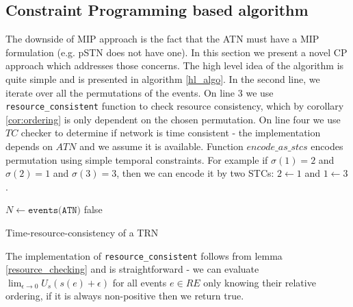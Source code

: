 \subsection{Constraint Programming based algorithm}
The downside of MIP approach is the fact that the ATN must have a MIP formulation (e.g. pSTN does not have one). In this section we present a novel CP approach which addresses those concerns. The high level idea of the algorithm is quite simple and is presented in algorithm \ref{hl_algo}. In the second line, we iterate over all the permutations of the events. On line 3 we use \texttt{resource\_consistent} function to check resource consistency, which by corollary \ref{cor:ordering} is only dependent on the chosen permutation. On line four we use $TC$ checker to determine if network is time consistent - the implementation depends on $ATN$ and we assume it is available. Function $encode\_as\_stcs$ encodes permutation using simple temporal constraints. For example if $\sigma(1) = 2$ and $\sigma(2) = 1$ and $\sigma(3) = 3$, then we can encode it by two STCs: $ 2 \leftarrow 1 $ and $1 \leftarrow 3$.

\begin{algorithm}[h]
    \label{hl_algo}
    $N \leftarrow \texttt{events(ATN)}$\;
    \Return false\;
    \caption{Time-resource-consistency of a TRN }
\end{algorithm}
The implementation of \texttt{resource\_consistent} follows from lemma \ref{resource_checking} and is straightforward - we can evaluate $\lim_{\epsilon \to 0} U_s(s(e) + \epsilon)$ for all events $e \in RE$ only knowing their relative ordering, if it is always non-positive then we return true.

